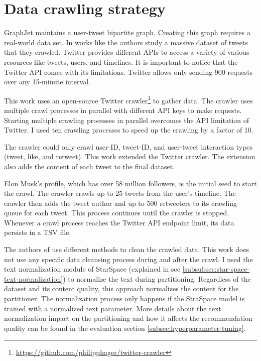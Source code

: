 \section{Data crawling strategy}
\label{sec:data-crawling-strategy}

GraphJet maintains a user-tweet bipartite graph. Creating this graph requires a real-world data set. In works like \cite{kwakWhatTwitterSocial2010} the authors study a massive dataset of tweets that they crawled. Twitter provides different APIs to access a variety of various resources like tweets, users, and timelines. It is important to notice that the Twitter API comes with its limitations. Twitter allows only sending 900 requests over any 15-minute interval. 


This work uses an open-source Twitter crawler\footnote{\url{https://github.com/philipphager/twitter-crawler}} to gather data. The crawler uses multiple crawl processes in parallel with different API keys to make requests. Starting multiple crawling processes in parallel overcomes the API limitation of Twitter. I used ten crawling processes to speed up the crawling by a factor of 10. 


The crawler could only crawl user-ID, tweet-ID, and user-tweet interaction types (tweet, like, and retweet). This work extended the Twitter crawler. The extension also adds the content of each tweet to the final dataset. 


Elon Musk's profile, which has over 58 million followers, is the initial seed to start the crawl. The crawler crawls up to 25 tweets from the user's timeline. The crawler then adds the tweet author and up to 500 retweeters to its crawling queue for each tweet. This process continues until the crawler is stopped. Whenever a crawl process reaches the Twitter API endpoint limit, its data persists in a TSV file.


The authors of \cite{kwakWhatTwitterSocial2010} use different methods to clean the crawled data. This work does not use any specific data cleansing process during and after the crawl. I used the text normalization module of StarSpace (explained in sec \ref{subsubsec:star-space-text-normalization}) to normalize the text during partitioning. Regardless of the dataset and its content quality, this approach normalizes the content for the partitioner. The normalization process only happens if the StraSpace model is trained with a normalized text parameter. More details about the text normalization impact on the partitioning and how it affects the recommendation quality can be found in the evaluation section \ref{subsec:hyperparameter-tuning}.


